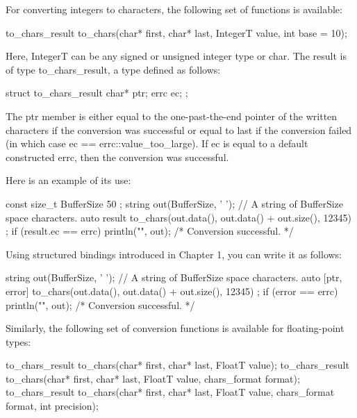 
For converting integers to characters, the following set of functions is available:

\begin{cpp}
to_chars_result to_chars(char* first, char* last, IntegerT value, int base = 10);
\end{cpp}

Here, IntegerT can be any signed or unsigned integer type or char. The result is of type to\_chars\_result, a type defined as follows:

\begin{cpp}
struct to_chars_result {
    char* ptr;
    errc ec;
};
\end{cpp}

The ptr member is either equal to the one-past-the-end pointer of the written characters if the conversion was successful or equal to last if the conversion failed (in which case ec == errc::value\_too\_large). If ec is equal to a default constructed errc, then the conversion was successful.

Here is an example of its use:

\begin{cpp}
const size_t BufferSize { 50 };
string out(BufferSize, ' '); // A string of BufferSize space characters.
auto result { to_chars(out.data(), out.data() + out.size(), 12345) };
if (result.ec == errc{}) { println("{}", out); /* Conversion successful. */ }
\end{cpp}

Using structured bindings introduced in Chapter 1, you can write it as follows:

\begin{cpp}
string out(BufferSize, ' '); // A string of BufferSize space characters.
auto [ptr, error] { to_chars(out.data(), out.data() + out.size(), 12345) };
if (error == errc{}) { println("{}", out); /* Conversion successful. */ }
\end{cpp}

Similarly, the following set of conversion functions is available for floating-point types:

\begin{cpp}
to_chars_result to_chars(char* first, char* last, FloatT value);
to_chars_result to_chars(char* first, char* last, FloatT value,
                         chars_format format);
to_chars_result to_chars(char* first, char* last, FloatT value,
                         chars_format format, int precision);
\end{cpp}

